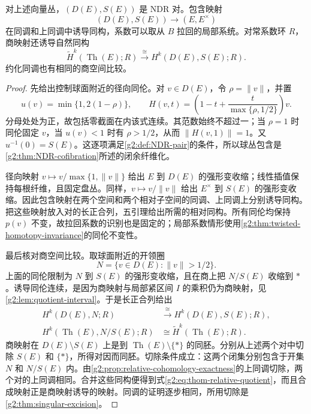 \begin{proposition}\label{g2:prop:thom-relative-models}
	对上述向量丛，\((D(E),S(E))\) 是 NDR 对。包含映射
	\[
		(D(E),S(E))\longrightarrow(E,E^\times)
	\]
	在同调和上同调中诱导同构，系数可以取从 \(B\) 拉回的局部系统。对常系数环 \(R\)，商映射还诱导自然同构
	\begin{equation}\label{g2:eq:thom-relative-quotient}
		\widetilde H^k(\operatorname{Th}(E);R)\xrightarrow{\ \cong\ }H^k(D(E),S(E);R).
	\end{equation}
	约化同调也有相同的商空间比较。
\end{proposition}
\begin{proof}
	先给出控制球面附近的径向同伦。对 \(v\in D(E)\)，令 \(\rho=\|v\|\)，并置
	\[
		u(v)=\min\{1,2(1-\rho)\},\qquad
		H(v,t)=\left(1-t+\frac{t}{\max\{\rho,1/2\}}\right)v.
	\]
	分母处处为正，故包括零截面在内该式连续。其范数始终不超过一；当 \(\rho=1\) 时同伦固定 \(v\)，当 \(u(v)<1\) 时有 \(\rho>1/2\)，从而 \(\|H(v,1)\|=1\)。又 \(u^{-1}(0)=S(E)\)。这逐项满足\cref{g2:def:NDR-pair}的条件，所以球丛包含是\cref{g2:thm:NDR-cofibration}所述的闭余纤维化。

	径向映射 \(v\mapsto v/\max\{1,\|v\|\}\) 给出 \(E\) 到 \(D(E)\) 的强形变收缩；线性插值保持每根纤维，且固定盘丛。同样，\(v\mapsto v/\|v\|\) 给出 \(E^\times\) 到 \(S(E)\) 的强形变收缩。因此包含映射在两个空间和两个相对子空间的同调、上同调上分别诱导同构。把这些映射放入对的长正合列，五引理给出所需的相对同构。所有同伦均保持 \(p(v)\) 不变，故拉回系数的识别也是固定的；局部系数情形使用\cref{g2:thm:twisted-homotopy-invariance}的同伦不变性。

	最后核对商空间比较。取球面附近的开领圈
	\[
		N=\{v\in D(E):\|v\|>1/2\}.
	\]
	上面的同伦限制为 \(N\) 到 \(S(E)\) 的强形变收缩，且在商上把 \(N/S(E)\) 收缩到 \(*\)。诱导同伦连续，是因为商映射与局部紧区间 \(I\) 的乘积仍为商映射，见\cref{g2:lem:quotient-interval}。于是长正合列给出
	\[
		\begin{aligned}
			H^k(D(E),N;R)&\xrightarrow{\ \cong\ }H^k(D(E),S(E);R),\\
			H^k(\operatorname{Th}(E),N/S(E);R)&\cong\widetilde H^k(\operatorname{Th}(E);R).
		\end{aligned}
	\]
	商映射在 \(D(E)\setminus S(E)\) 上是到 \(\operatorname{Th}(E)\setminus\{*\}\) 的同胚。分别从上述两个对中切除 \(S(E)\) 和 \(\{*\}\)，所得对因而同胚。切除条件成立：这两个闭集分别包含于开集 \(N\) 和 \(N/S(E)\) 内。由\cref{g2:prop:relative-cohomology-exactness}的上同调切除，两个对的上同调相同。合并这些同构便得到式\eqref{g2:eq:thom-relative-quotient}，而且合成映射正是商映射诱导的映射。同调的证明逐步相同，所用切除是\cref{g2:thm:singular-excision}。
\end{proof}

